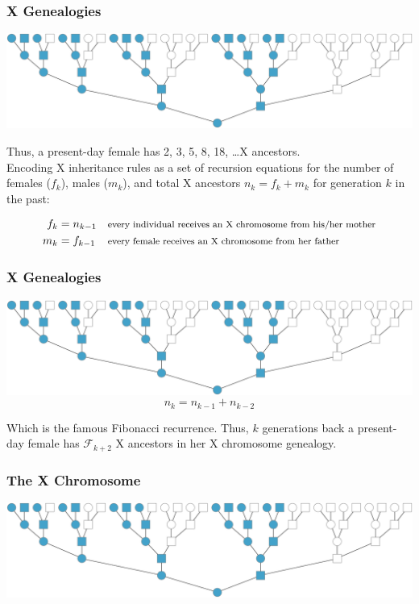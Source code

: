 \documentclass[hyperref={colorlinks = true,
                         urlcolor = blue,
                         linkcolor = blue}]{beamer}
\begin{document}
\begin{frame}
  \frametitle{X Genealogies}
  \includegraphics[width=\textwidth]{fig/x-genealogy}

  {\footnotesize Thus, a present-day female has 2, 3, 5, 8, 18, \ldots X
    ancestors.\\[1em]

  Encoding X inheritance rules as a set of recursion equations for the number
  of females ($f_k$), males ($m_k$), and total X ancestors $n_k = f_k + m_k$ for
  generation $k$ in the past:}

  \begin{align*}
    f_k &= n_{k-1} && \text{\footnotesize every individual receives an X chromosome from his/her mother}\\
    m_k &= f_{k-1} && \text{\footnotesize every female receives an X chromosome from her father}
  \end{align*}

\end{frame}


\begin{frame}
  \frametitle{X Genealogies}
  \includegraphics[width=\textwidth]{fig/x-genealogy}
  \begin{equation}
    n_k = n_{k-1} + n_{k-2}
  \end{equation}

  Which is the famous Fibonacci recurrence. Thus, $k$ generations back a present-day female has $\mathcal{F}_{k+2}$ X ancestors in her X chromosome genealogy.
\end{frame}

\begin{frame}
  \frametitle{The X Chromosome}
  \includegraphics[width=\textwidth]{fig/x-genealogy}
   
\end{frame}
\end{document}
